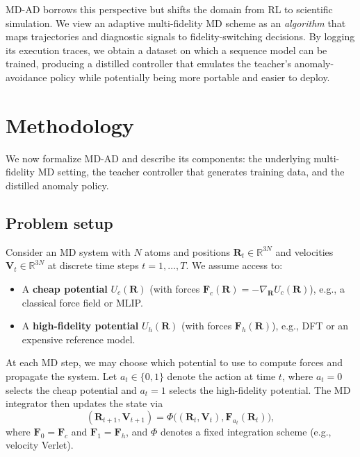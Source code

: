 \documentclass{article}
\begin{document}
MD-AD borrows this perspective but shifts the domain from RL to scientific simulation. We view an adaptive multi-fidelity MD scheme as an \emph{algorithm} that maps trajectories and diagnostic signals to fidelity-switching decisions. By logging its execution traces, we obtain a dataset on which a sequence model can be trained, producing a distilled controller that emulates the teacher's anomaly-avoidance policy while potentially being more portable and easier to deploy.

\section{Methodology}
\label{sec:method}

We now formalize MD-AD and describe its components: the underlying multi-fidelity MD setting, the teacher controller that generates training data, and the distilled anomaly policy.

\subsection{Problem setup}

Consider an MD system with $N$ atoms and positions $\mathbf{R}_t \in \mathbb{R}^{3N}$ and velocities $\mathbf{V}_t \in \mathbb{R}^{3N}$ at discrete time steps $t = 1, \dots, T$. We assume access to:
\begin{itemize}
    \item A \textbf{cheap potential} $U_c(\mathbf{R})$ (with forces $\mathbf{F}_c(\mathbf{R}) = -\nabla_{\mathbf{R}} U_c(\mathbf{R})$), e.g., a classical force field or MLIP.
    \item A \textbf{high-fidelity potential} $U_h(\mathbf{R})$ (with forces $\mathbf{F}_h(\mathbf{R})$), e.g., DFT or an expensive reference model.
\end{itemize}
At each MD step, we may choose which potential to use to compute forces and propagate the system. Let $a_t \in \{0,1\}$ denote the action at time $t$, where $a_t = 0$ selects the cheap potential and $a_t = 1$ selects the high-fidelity potential. The MD integrator then updates the state via
\begin{equation}
    (\mathbf{R}_{t+1}, \mathbf{V}_{t+1}) = \Phi\big((\mathbf{R}_t, \mathbf{V}_t), \mathbf{F}_{a_t}(\mathbf{R}_t)\big),
\end{equation}
where $\mathbf{F}_{0} = \mathbf{F}_c$ and $\mathbf{F}_{1} = \mathbf{F}_h$, and $\Phi$ denotes a fixed integration scheme (e.g., velocity Verlet).
\end{document}
